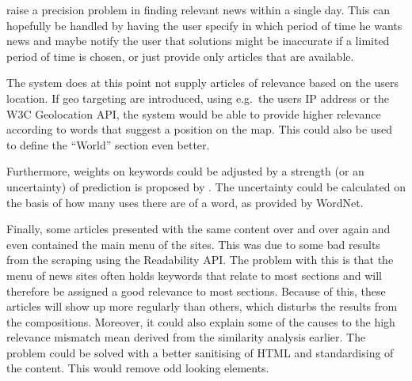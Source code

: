 \cite{Sections-categories-and-keywords-as-interest-specification-tools-for-personalised-news-services.pdf} raise a precision problem in finding relevant news within a single day. This can hopefully be handled by having the user specify in which period of time he wants news and maybe notify the user that solutions might be inaccurate if a limited period of time is chosen, or just provide only articles that are available.
%
%

The system does at this point not supply articles of relevance based on the users location. If geo targeting are introduced, using e.g.\ the users IP address or the W3C Geolocation API, the system would be able to provide higher relevance according to words that suggest a position on the map. This could also be used to define the ``World'' section even better.

Furthermore, weights on keywords could be adjusted by a strength (or an uncertainty) of prediction is proposed by \cite{10.1.1.45.5230.pdf}. The uncertainty could be calculated on the basis of how many uses there are of a word, as provided by WordNet.

Finally, some articles presented with the same content over and over again and even contained the main menu of the sites. This was due to some bad results from the scraping using the Readability API. The problem with this is that the menu of news sites often holds keywords that relate to most sections and will therefore be assigned a good relevance to most sections. Because of this, these articles will show up more regularly than others, which disturbs the results from the compositions. Moreover, it could also explain some of the causes to the high relevance mismatch mean derived from the similarity analysis earlier. The problem could be solved with a better sanitising of HTML and standardising of the content. This would remove odd looking elements.

